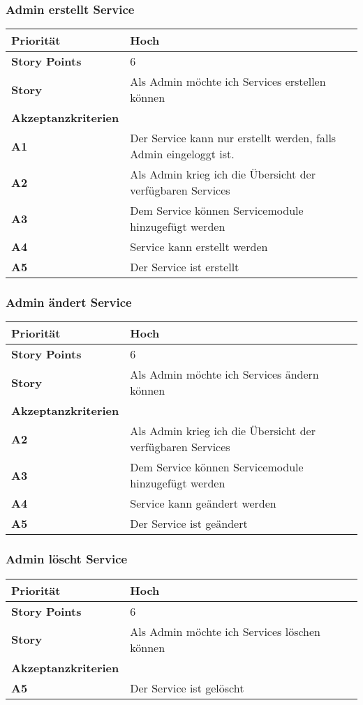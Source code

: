  \subsubsection{Admin erstellt Service}
 \begin{tabularx}{\linewidth}{l X}
  \textbf{Priorität} & Hoch\\
  \hline
  \textbf{Story Points} & 6\\
  \hline
  \textbf{Story}& Als Admin möchte ich Services erstellen können\\
  \hline
    \textbf{Akzeptanzkriterien} & \\
    \hline
      \textbf{A1} & Der Service kann nur erstellt werden, falls Admin eingeloggt ist.\\
  \hline
  \textbf{A2} & Als Admin krieg ich die Übersicht der verfügbaren Services\\
  \hline
    \textbf{A3} & Dem Service können Servicemodule hinzugefügt werden\\
  \hline
  \textbf{A4} & Service kann erstellt werden\\
  \hline
    \textbf{A5} & Der Service ist erstellt\\
  \hline
 \end{tabularx}
 
 \subsubsection{Admin ändert Service}
 \begin{tabularx}{\linewidth}{l X}
  \textbf{Priorität} & Hoch\\
  \hline
  \textbf{Story Points} & 6\\
  \hline
  \textbf{Story}& Als Admin möchte ich Services ändern können\\
  \hline
    \textbf{Akzeptanzkriterien} & \\
    \hline
  \textbf{A2} & Als Admin krieg ich die Übersicht der verfügbaren Services\\
  \hline
    \textbf{A3} & Dem Service können Servicemodule hinzugefügt werden\\
  \hline
  \textbf{A4} & Service kann geändert werden\\
  \hline
    \textbf{A5} & Der Service ist geändert\\
  \hline
 \end{tabularx}

 \subsubsection{Admin löscht Service}
 
  \begin{tabularx}{\linewidth}{l X}
  \textbf{Priorität} & Hoch\\
  \hline
  \textbf{Story Points} & 6\\
  \hline
  \textbf{Story}& Als Admin möchte ich Services löschen können\\
  \hline
    \textbf{Akzeptanzkriterien} & \\
  \hline
    \textbf{A5} & Der Service ist gelöscht\\
  \hline
 \end{tabularx}
